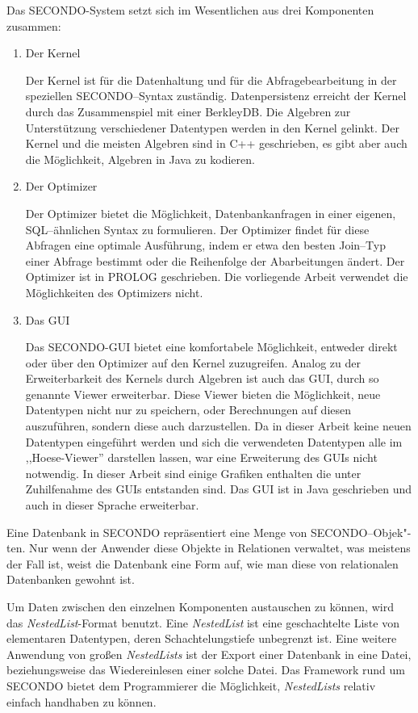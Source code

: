 Das SECONDO-System setzt sich im Wesentlichen aus drei Komponenten zusammen:
\begin{enumerate}
\item Der Kernel

Der Kernel ist für die Datenhaltung und für die Abfragebearbeitung in der speziellen SECONDO--Syntax zuständig. Datenpersistenz erreicht der Kernel durch das Zusammenspiel mit einer BerkleyDB. Die Algebren zur Unterstützung verschiedener Datentypen werden in den Kernel gelinkt. Der Kernel und die meisten Algebren sind in C++ geschrieben, es gibt aber auch die Möglichkeit, Algebren in Java zu kodieren.

\item Der Optimizer

Der Optimizer bietet die Möglichkeit, Datenbankanfragen in einer eigenen, SQL--ähnlichen Syntax zu formulieren. Der Optimizer findet für diese Abfragen eine optimale Ausführung, indem er etwa den besten Join--Typ einer Abfrage bestimmt oder die Reihenfolge der Abarbeitungen ändert. Der Optimizer ist in PROLOG geschrieben. Die vorliegende Arbeit verwendet die Möglichkeiten des Optimizers nicht.

\item Das GUI

Das SECONDO-GUI bietet eine komfortabele Möglichkeit, entweder direkt oder  über den Optimizer  auf den Kernel zuzugreifen. Analog zu der Erweiterbarkeit des Kernels durch Algebren ist auch das GUI, durch so genannte Viewer erweiterbar. Diese Viewer bieten die Möglichkeit, neue Datentypen nicht nur zu speichern, oder Berechnungen auf diesen auszuführen, sondern diese auch darzustellen. Da in dieser Arbeit keine neuen Datentypen eingeführt werden und sich die verwendeten Datentypen alle im ,,Hoese-Viewer'' darstellen lassen, war eine Erweiterung des GUIs nicht notwendig. In dieser Arbeit sind einige Grafiken enthalten die unter Zuhilfenahme des GUIs entstanden sind. Das GUI ist in Java geschrieben und auch in dieser Sprache erweiterbar.

\end{enumerate}

Eine Datenbank in SECONDO repräsentiert eine Menge von SECONDO--Objek"-ten. Nur wenn der Anwender diese Objekte in Relationen verwaltet, was meistens der Fall ist, weist die Datenbank eine Form auf, wie man diese von relationalen Datenbanken gewohnt ist.

Um Daten zwischen den einzelnen Komponenten austauschen zu können, wird das \textit{NestedList}-Format benutzt. Eine \textit{NestedList} ist eine geschachtelte Liste von elementaren Datentypen, deren Schachtelungstiefe unbegrenzt ist. Eine weitere Anwendung von großen \textit{NestedLists} ist der Export einer Datenbank in eine Datei, beziehungsweise das Wiedereinlesen einer solche Datei. Das Framework rund um SECONDO bietet dem Programmierer die Möglichkeit, \textit{NestedLists} relativ einfach handhaben zu können.


